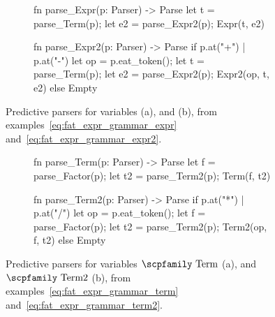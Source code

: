 \documentclass[
  oneside,
  english,
  coorientadorbanca,
  noabntexcite
]{ufsc-thesis-rn46-2019}
\newcommand{\codett}[1]{\text{\scpfamily#1}}
\newcommand{\bnfvar}[1]{\codett{#1}}
\begin{document}
\begin{figure}[ht]
  \centering
  \begin{subfigure}[b]{0.48\textwidth}
    \begin{minipage}{\textwidth}
      \begin{rustcode}
fn parse_Expr(p: Parser) -> Parse {
  let t = parse_Term(p);
  let e2 = parse_Expr2(p);
  Expr(t, e2)
}
      \end{rustcode}
    \end{minipage}
    \caption{}\label{fig:predictive_parser_expr}
  \end{subfigure}
  \quad
  \begin{subfigure}[b]{0.48\textwidth}
    \begin{minipage}{\textwidth}
      \begin{rustcode}
fn parse_Expr2(p: Parser) -> Parse {
  if p.at("+") | p.at("-") {
    let op = p.eat_token();
    let t = parse_Term(p);
    let e2 = parse_Expr2(p);
    Expr2(op, t, e2)
  } else {
    Empty
  }
}
      \end{rustcode}
    \end{minipage}
    \caption{}\label{fig:predictive_parser_expr2}
  \end{subfigure}
  \caption{
    Predictive parsers for variables \bnfvar{Expr} (a), and \bnfvar{Expr2} (b), from examples~\eqref{eq:fat_expr_grammar_expr} and~\eqref{eq:fat_expr_grammar_expr2}.
  }\label{fig:predictive_parser_expr_all}
\end{figure}

\begin{figure}[ht]
  \centering
  \begin{subfigure}[b]{0.48\textwidth}
    \begin{minipage}{\textwidth}
      \begin{rustcode}
fn parse_Term(p: Parser) -> Parse {
  let f = parse_Factor(p);
  let t2 = parse_Term2(p);
  Term(f, t2)
}
      \end{rustcode}
    \end{minipage}
    \caption{}\label{fig:predictive_parser_term}
  \end{subfigure}
  \quad
  \begin{subfigure}[b]{0.48\textwidth}
    \begin{minipage}{\textwidth}
      \begin{rustcode}
fn parse_Term2(p: Parser) -> Parse {
  if p.at("*") | p.at("/") {
    let op = p.eat_token();
    let f = parse_Factor(p);
    let t2 = parse_Term2(p);
    Term2(op, f, t2)
  } else {
    Empty
  }
}
      \end{rustcode}
    \end{minipage}
    \caption{}\label{fig:predictive_parser_term2}
  \end{subfigure}
  \caption{
    Predictive parsers for variables $\bnfvar{Term}$ (a), and $\bnfvar{Term2}$ (b), from examples~\eqref{eq:fat_expr_grammar_term} and~\eqref{eq:fat_expr_grammar_term2}.
  }\label{fig:predictive_parser_expr_term_all}
\end{figure}
\end{document}
